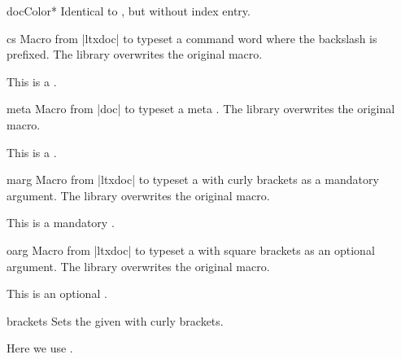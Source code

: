 \begin{docCommand}{docColor*}{}
  Identical to , but without index entry.
\end{docCommand}


\clearpage
\begin{docCommand}{cs}{}
  Macro from |ltxdoc| \cite{carlisle:2007a} to typeset a command word 
  where the backslash is prefixed. The library overwrites the original macro.
\begin{dispExample}
This is a .
\end{dispExample}
\end{docCommand}

\begin{docCommand}{meta}{}
  Macro from |doc| \cite{mittelbach:2011a} to typeset a meta .
  The library overwrites the original macro.
\begin{dispExample}
This is a .
\end{dispExample}
\end{docCommand}


\begin{docCommand}{marg}{}
  Macro from |ltxdoc| \cite{carlisle:2007a} to typeset a  with
  curly brackets as a mandatory argument. The library overwrites the original macro.
\begin{dispExample}
This is a mandatory .
\end{dispExample}
\end{docCommand}

\begin{docCommand}{oarg}{}
  Macro from |ltxdoc| \cite{carlisle:2007a} to typeset a  with
  square brackets as an optional argument. The library overwrites the original macro.
\begin{dispExample}
This is an optional .
\end{dispExample}
\end{docCommand}


\begin{docCommand}{brackets}{}
  Sets the given  with curly brackets.
\begin{dispExample}
  Here we use .
\end{dispExample}
\end{docCommand}

\clearpage

